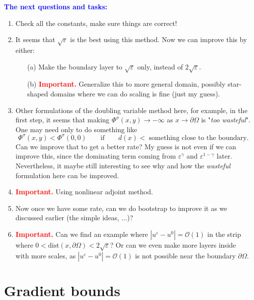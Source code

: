 \documentclass[11pt,reqno]{amsart}
\numberwithin{figure}{section}
\theoremstyle{plain}
\theoremstyle{remark}
\numberwithin{equation}{section}
\begin{document}
\color{blue}
\textcolor{blue}{\textbf{The next questions and tasks:}}
\begin{enumerate}
    \item Check all the constants, make sure things are correct!
    \item It seems that $\sqrt{\varepsilon}$ is the best using this method. Now we can improve this by either:
    \begin{itemize}
        \item[(a)] Make the boundary layer to $\sqrt{\varepsilon}$ only, instead of $2\sqrt{\varepsilon}$.
        \item[(b)] \textcolor{red}{\textbf{Important.}} Generalize this to more general domain, possibly star-shaped domains where we can do scaling is fine (just my guess).
    \end{itemize}
    \item Other formulations of the doubling variable method here, for example, in the first step, it seems that making $\Phi^\sigma(x,y)\to  -\infty$ as $x\to \partial\Omega$ is "\emph{too wasteful}". One may need only to do something like
    \begin{equation*}
        \Phi^\sigma(x,y) < \Phi^\sigma(0,0) \qquad\text{if}\qquad d(x) < \;\text{something close to the boundary}.
    \end{equation*}
    Can we improve that to get a better rate? My guess is not even if we can improve this, since the dominating term coming from $\varepsilon^\gamma$ and $\varepsilon^{1-\gamma}$ later. Nevertheless, it maybe still interesting to see why and how the \emph{wasteful} formulation here can be improved.
    \item \textcolor{red}{\textbf{Important.}} Using nonlinear adjoint method.
    \item Now once we have some rate, can we do bootstrap to improve it as we discussed earlier (the simple ideas, ...)?
    \item \textcolor{red}{\textbf{Important.}} Can we find an example where $|u^\varepsilon - u^0| = \mathcal{O}(1)$ in the strip where $0<\mathrm{dist}(x,\partial\Omega)<2\sqrt{\varepsilon}$? Or can we even make more layers inside with more scales, as $|u^\varepsilon - u^0| = \mathcal{O}(1)$ is not possible near the boundary $\partial\Omega$.
\end{enumerate}
\color{black}



\section{Gradient bounds}
\end{document}

